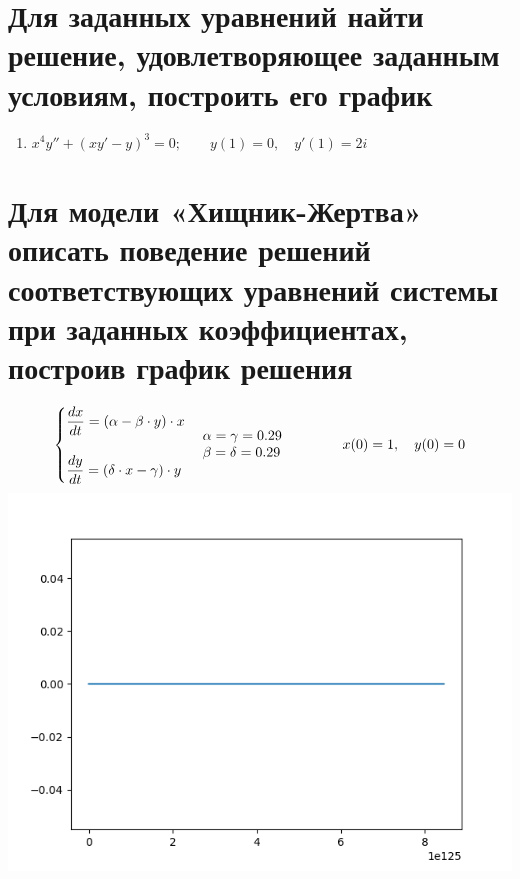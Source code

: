 \documentclass[14pt, a4paper]{extarticle}
\begin{document}
	\section{Для заданных уравнений найти решение, удовлетворяющее заданным условиям, построить его график}
		\begin{enumerate}
			\item \(x^4 y'' + \left(xy' - y\right)^3 = 0; \qquad y(1) = 0, \quad y'(1) = 2i\)
		\end{enumerate}
		\pagebreak
		
	\section{Для модели «Хищник-Жертва» описать поведение решений соответствующих уравнений системы при заданных коэффициентах, построив график решения}
		\begin{align*}
			\begin{cases}
				\dfrac{dx}{dt} = \left(\alpha - \beta \cdot y\right) \cdot x \\ \\				
				\dfrac{dy}{dt} = \left(\delta \cdot x - \gamma \right) \cdot y
			\end{cases}
			\parbox{100pt}{\(\alpha = \gamma = 0.29\)  \\ \(\beta = \delta = 0.29\)}
			x(0) = 1, \quad y(0) = 0
		\end{align*}
		\hspace{1cm}\includegraphics[width=15cm]{plot}
		\pagebreak
		
\end{document}
